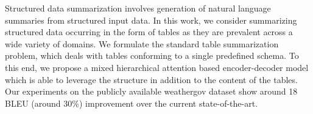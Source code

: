 Structured data summarization involves generation of natural language summaries from structured input data. In this work, we consider summarizing structured data occurring in the form of tables as they are prevalent across a wide variety of domains. We formulate the standard table summarization problem, which deals with tables conforming to a single predefined schema. To this end, we propose a mixed hierarchical attention based encoder-decoder model which is able to leverage the structure in addition to the content of the tables. Our experiments on the publicly available weathergov dataset show around 18 BLEU (around 30\%) improvement over the current state-of-the-art.
